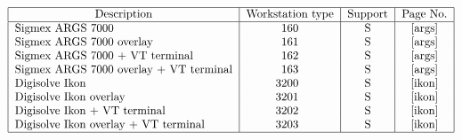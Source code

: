 \begin{table}\caption{Image Displays}
\[\begin{tabular}{|l|c|c|c|}\hline
\multicolumn{1}{|c|}{Description} &Workstation type &Support &Page No.\\\hline
Sigmex ARGS 7000                       &  160 &S &\pageref{args}\\
Sigmex ARGS 7000 overlay               &  161 &S &\pageref{args}\\
Sigmex ARGS 7000 + VT terminal         &  162 &S &\pageref{args}\\
Sigmex ARGS 7000 overlay + VT terminal &  163 &S &\pageref{args}\\
Digisolve Ikon                         & \makebox[0pt][r]{3}200 &S
&\pageref{ikon}\\
Digisolve Ikon overlay                 & \makebox[0pt][r]{3}201 &S
&\pageref{ikon}\\
Digisolve Ikon + VT terminal           & \makebox[0pt][r]{3}202 &S
&\pageref{ikon}\\
Digisolve Ikon overlay + VT terminal   & \makebox[0pt][r]{3}203 &S
&\pageref{ikon}\\
\hline\end{tabular}\]\end{table}

